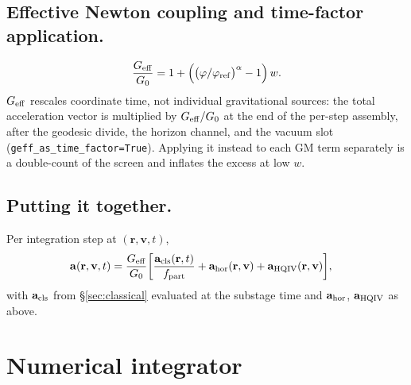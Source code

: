 \documentclass[11pt]{amsart}
\begin{document}
\subsection{Effective Newton coupling and time-factor application.}
\begin{equation}\label{eq:geff}
\frac{G_{\rm eff}}{G_0}=1+\Bigl(\bigl(\varphi/\varphi_{\rm ref}\bigr)^\alpha-1\Bigr)\,w.
\end{equation}
$G_{\rm eff}$ rescales coordinate time, not individual gravitational sources: the total
acceleration vector is multiplied by $G_{\rm eff}/G_0$ at the end of the per-step
assembly, after the geodesic divide, the horizon channel, and the vacuum slot
(\texttt{geff\_as\_time\_factor=True}). Applying it instead to each GM term separately is a
double-count of the screen and inflates the excess at low $w$.

\subsection{Putting it together.}
Per integration step at $(\mathbf r,\mathbf v,t)$,
\begin{align}
\mathbf a(\mathbf r,\mathbf v,t)
  &= \frac{G_{\rm eff}}{G_0}\biggl[
       \frac{\mathbf a_{\rm cls}(\mathbf r,t)}{f_{\rm part}}
     + \mathbf a_{\rm hor}(\mathbf r,\mathbf v)
     + \mathbf a_{\rm HQIV}(\mathbf r,\mathbf v)\biggr],
\end{align}
with $\mathbf a_{\rm cls}$ from \S\ref{sec:classical} evaluated at the substage time and
$\mathbf a_{\rm hor}$, $\mathbf a_{\rm HQIV}$ as above.

\section{Numerical integrator}\label{sec:solver}
\end{document}
